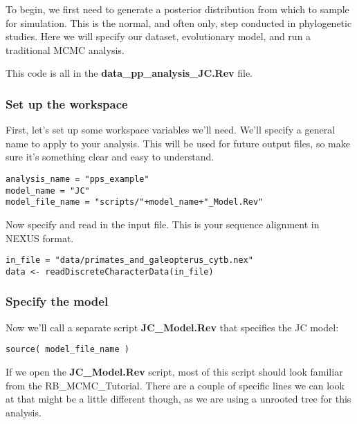To begin, we first need to generate a posterior distribution from which to sample for simulation. 
This is the normal, and often only, step conducted in phylogenetic studies. Here we will specify our 
dataset, evolutionary model, and run a traditional MCMC analysis. 

This code is all in the \textbf{data\_pp\_analysis\_JC.Rev} file.

\subsubsection{Set up the workspace}

First, let's set up some workspace variables we'll need.
We'll specify a general name to apply to your analysis. This will be used for future output files, so make sure it's something clear and easy to understand.
{\tt \begin{Snugshade}[184,207,236]
\begin{lstlisting}
analysis_name = "pps_example"
model_name = "JC"
model_file_name = "scripts/"+model_name+"_Model.Rev"
\end{lstlisting}
\end{Snugshade}}

Now specify and read in the input file. This is your sequence alignment in NEXUS format.
{\tt \begin{Snugshade}[184,207,236]
\begin{lstlisting}
in_file = "data/primates_and_galeopterus_cytb.nex"
data <- readDiscreteCharacterData(in_file)
\end{lstlisting}
\end{Snugshade}}

\subsubsection{Specify the model}

Now we'll call a separate script \textbf{JC\_Model.Rev} that specifies the JC model:
{\tt \begin{Snugshade}[184,207,236]
\begin{lstlisting}
source( model_file_name ) 
\end{lstlisting}
\end{Snugshade}}

If we open the \textbf{JC\_Model.Rev} 
script, most of this script should look familiar from the RB\_MCMC\_Tutorial. There are a couple of specific 
lines we can look at that might be a little different though, as we are using a unrooted tree for this
analysis. 

